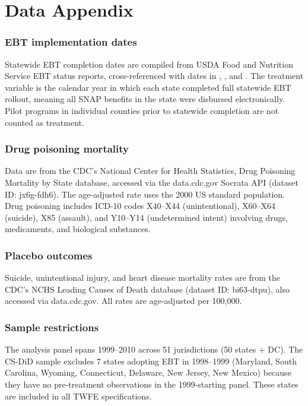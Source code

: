 \documentclass[12pt]{article}
\begin{document}
\section{Data Appendix}

\subsubsection*{EBT implementation dates} Statewide EBT completion dates are compiled from USDA Food and Nutrition Service EBT status reports, cross-referenced with dates in \citet{currie2008transfers}, \citet{whitmore2002food}, and \citet{ratcliffe2011snap}. The treatment variable is the calendar year in which each state completed full statewide EBT rollout, meaning all SNAP benefits in the state were disbursed electronically. Pilot programs in individual counties prior to statewide completion are not counted as treatment.

\subsubsection*{Drug poisoning mortality} Data are from the CDC's National Center for Health Statistics, Drug Poisoning Mortality by State database, accessed via the data.cdc.gov Socrata API (dataset ID: jx6g-fdh6). The age-adjusted rate uses the 2000 US standard population. Drug poisoning includes ICD-10 codes X40--X44 (unintentional), X60--X64 (suicide), X85 (assault), and Y10--Y14 (undetermined intent) involving drugs, medicaments, and biological substances.

\subsubsection*{Placebo outcomes} Suicide, unintentional injury, and heart disease mortality rates are from the CDC's NCHS Leading Causes of Death database (dataset ID: bi63-dtpu), also accessed via data.cdc.gov. All rates are age-adjusted per 100,000.

\subsubsection*{Sample restrictions} The analysis panel spans 1999--2010 across 51 jurisdictions (50 states + DC). The CS-DiD sample excludes 7 states adopting EBT in 1998--1999 (Maryland, South Carolina, Wyoming, Connecticut, Delaware, New Jersey, New Mexico) because they have no pre-treatment observations in the 1999-starting panel. These states are included in all TWFE specifications.
\end{document}
